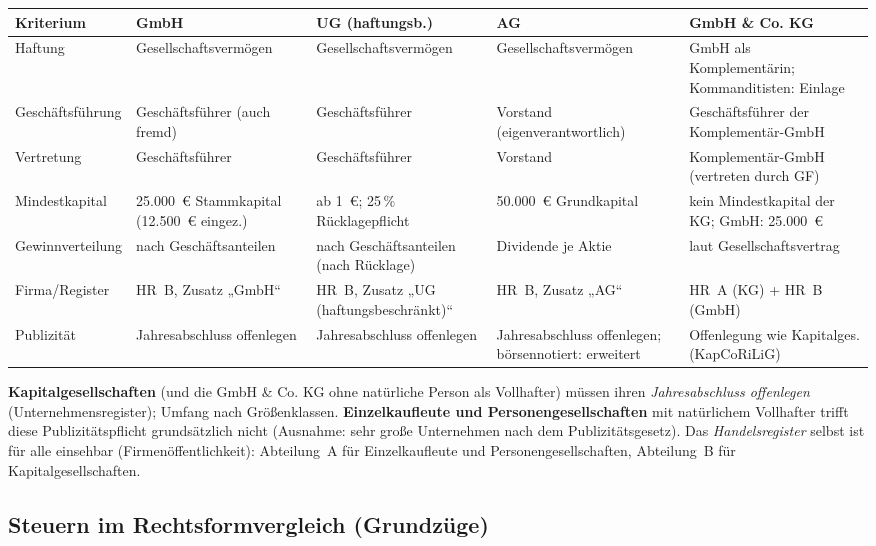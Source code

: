 \documentclass[11pt, a4paper]{article}
\begin{document}
\begin{center}
\small
\begin{tabular}{p{2.6cm} p{3.1cm} p{2.9cm} p{2.8cm} p{2.8cm}}
\toprule
\textbf{Kriterium} & \textbf{GmbH} & \textbf{UG (haftungsb.)} & \textbf{AG} & \textbf{GmbH \& Co. KG}\\
\midrule
Haftung & Gesellschaftsvermögen & Gesellschaftsvermögen & Gesellschaftsvermögen & GmbH als Komplementärin; Kommanditisten: Einlage\\
\addlinespace
Geschäftsführung & Geschäftsführer (auch fremd) & Geschäftsführer & Vorstand (eigenverantwortlich) & Geschäftsführer der Komplementär-GmbH\\
\addlinespace
Vertretung & Geschäftsführer & Geschäftsführer & Vorstand & Komplementär-GmbH (vertreten durch GF)\\
\addlinespace
Mindestkapital & 25.000~€ Stammkapital (12.500~€ eingez.) & ab 1~€; 25\,\% Rücklagepflicht & 50.000~€ Grundkapital & kein Mindestkapital der KG; GmbH: 25.000~€\\
\addlinespace
Gewinnverteilung & nach Geschäftsanteilen & nach Geschäftsanteilen (nach Rücklage) & Dividende je Aktie & laut Gesellschaftsvertrag\\
\addlinespace
Firma/Register & HR~B, Zusatz „GmbH`` & HR~B, Zusatz „UG (haftungsbeschränkt)`` & HR~B, Zusatz „AG`` & HR~A (KG) + HR~B (GmbH)\\
\addlinespace
Publizität & Jahresabschluss offenlegen & Jahresabschluss offenlegen & Jahresabschluss offenlegen; börsennotiert: erweitert & Offenlegung wie Kapitalges. (KapCoRiLiG)\\
\bottomrule
\end{tabular}
\end{center}

\begin{merksatz}[title={\bfseries Publizität}]
\textbf{Kapitalgesellschaften} (und die GmbH \& Co. KG ohne natürliche Person als
Vollhafter) müssen ihren \emph{Jahresabschluss offenlegen} (Unternehmensregister);
Umfang nach Größenklassen. \textbf{Einzelkaufleute und Personengesellschaften} mit
natürlichem Vollhafter trifft diese Publizitätspflicht grundsätzlich nicht (Ausnahme:
sehr große Unternehmen nach dem Publizitätsgesetz). Das \emph{Handelsregister} selbst ist
für alle einsehbar (Firmenöffentlichkeit): Abteilung~A für Einzelkaufleute und
Personengesellschaften, Abteilung~B für Kapitalgesellschaften.
\end{merksatz}

\subsection{Steuern im Rechtsformvergleich (Grundzüge)}
\end{document}
